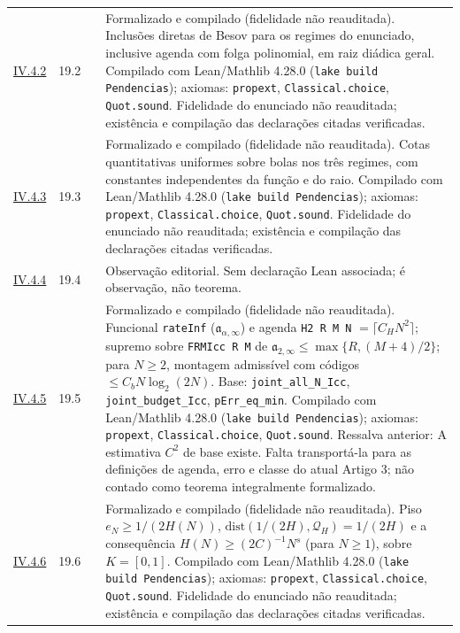\documentclass[12pt,a4paper]{article}
\theoremstyle{preciso}
\theoremstyle{definition}
\theoremstyle{preciso}
\theoremstyle{preciso}
\theoremstyle{preciso}
\theoremstyle{preciso}
\theoremstyle{definition}
\theoremstyle{preciso}
\theoremstyle{definition}
\theoremstyle{preciso}
\theoremstyle{preciso}
\theoremstyle{definition}
\begin{document}
\begin{singlespace}
\begin{longtable}{@{}p{.11\linewidth}p{.09\linewidth}p{.09\linewidth}p{.59\linewidth}@{}}
\hyperref[map:artigo_3:4.2]{IV.4.2} & 19.2 & \pageref{map:artigo_3:4.2} & Formalizado e compilado (fidelidade não reauditada). Inclusões diretas de Besov para os regimes do enunciado, inclusive agenda com folga polinomial, em raiz diádica geral. Compilado com Lean/Mathlib 4.28.0 (\texttt{lake build Pendencias}); axiomas: \texttt{propext}, \texttt{Classical.choice}, \texttt{Quot.sound}. Fidelidade do enunciado não reauditada; existência e compilação das declarações citadas verificadas.\\[4pt]
\hyperref[map:artigo_3:4.3]{IV.4.3} & 19.3 & \pageref{map:artigo_3:4.3} & Formalizado e compilado (fidelidade não reauditada). Cotas quantitativas uniformes sobre bolas nos três regimes, com constantes independentes da função e do raio. Compilado com Lean/Mathlib 4.28.0 (\texttt{lake build Pendencias}); axiomas: \texttt{propext}, \texttt{Classical.choice}, \texttt{Quot.sound}. Fidelidade do enunciado não reauditada; existência e compilação das declarações citadas verificadas.\\[4pt]
\hyperref[map:artigo_3:4.4]{IV.4.4} & 19.4 & \pageref{map:artigo_3:4.4} & Observação editorial. Sem declaração Lean associada; é observação, não teorema.\\[4pt]
\hyperref[map:artigo_3:4.5]{IV.4.5} & 19.5 & \pageref{map:artigo_3:4.5} & Formalizado e compilado (fidelidade não reauditada). Funcional \texttt{rateInf} ($\mathfrak{a}_{\alpha,\infty}$) e agenda \texttt{H2 R M N} $=\lceil C_H N^2\rceil$; supremo sobre \texttt{FRMIcc R M} de $\mathfrak{a}_{2,\infty}\le\max\{R,(M+4)/2\}$; para $N\ge 2$, montagem admissível com códigos $\le C_b N\log_2(2N)$. Base: \texttt{joint\_all\_N\_Icc}, \texttt{joint\_budget\_Icc}, \texttt{pErr\_eq\_min}. Compilado com Lean/Mathlib 4.28.0 (\texttt{lake build Pendencias}); axiomas: \texttt{propext}, \texttt{Classical.choice}, \texttt{Quot.sound}. Ressalva anterior: A estimativa $C^2$ de base existe. Falta transportá-la para as definições de agenda, erro e classe do atual Artigo 3; não contado como teorema integralmente formalizado.\\[4pt]
\hyperref[map:artigo_3:4.6]{IV.4.6} & 19.6 & \pageref{map:artigo_3:4.6} & Formalizado e compilado (fidelidade não reauditada). Piso $e_N\ge 1/(2H(N))$, $\mathrm{dist}(1/(2H),\mathcal{Q}_H)=1/(2H)$ e a consequência $H(N)\ge (2C)^{-1}N^s$ (para $N\ge 1$), sobre $K=[0,1]$. Compilado com Lean/Mathlib 4.28.0 (\texttt{lake build Pendencias}); axiomas: \texttt{propext}, \texttt{Classical.choice}, \texttt{Quot.sound}. Fidelidade do enunciado não reauditada; existência e compilação das declarações citadas verificadas.\\[4pt]

\end{longtable}
\end{singlespace}
\end{document}
